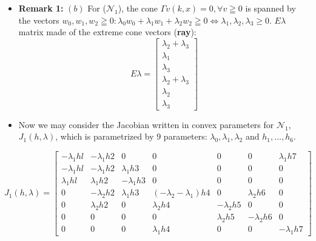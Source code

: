 \documentclass[aspectratio=169]{beamer}
\begin{document}
\begin{frame}
	\begin{itemize}
		\item \textbf{Remark 1:} $(b)$ For ($\mathcal{N}_1$), the cone $\Gamma v(k,x) = 0, \forall v \geqq 0$ is spanned by the vectors $w_0, w_1, w_2 \geqq 0 : \lambda_0 w_0 + \lambda_1 w_1 + \lambda_2 w_2 \geqq 0 \iff \lambda_1, \lambda_2, \lambda_3 \geq 0$.	
			$E\lambda$ matrix made of the extreme cone vectors (\textbf{ray}):
			\[
				E\lambda =
				\begin{bmatrix}
					\lambda_2 + \lambda_3 \\
					\lambda_1 \\
					\lambda_3 \\
					\lambda_2 + \lambda_3 \\
					\lambda_2 \\
					\lambda_3
				\end{bmatrix}
			\]
		\item Now we may consider the Jacobian written in convex parameters for $\mathcal{N}_1$, $J_1(h,\lambda)$, which is parametrized by $9$ parameters: $\lambda_0, \lambda_1, \lambda_2$ and $h_1, \ldots, h_6$.
	\end{itemize}
\end{frame}

\begin{frame}
	\[
		\left. J_1(h, \lambda) =\left[
			\begin{array}{ccccccc}-\lambda_1hl&-\lambda_1h2&0&0&0&0&\lambda_1h7\\-\lambda_1hl&-\lambda_1h2&\lambda_1h3&0&0&0&0\\\lambda_1hl&\lambda_1h2&-\lambda_1h3&0&0&0&0\\0&-\lambda_2h2&\lambda_1h3&(-\lambda_2-\lambda_1)h4&0&\lambda_2h6&0\\0&\lambda_2h2&0&\lambda_2h4&-\lambda_2h5&0&0\\0&0&0&0&\lambda_2h5&-\lambda_2h6&0\\0&0&0&\lambda_1h4&0&0&-\lambda_1h7
		\end{array}\right.\right]
	\]
\end{frame}
\end{document}
